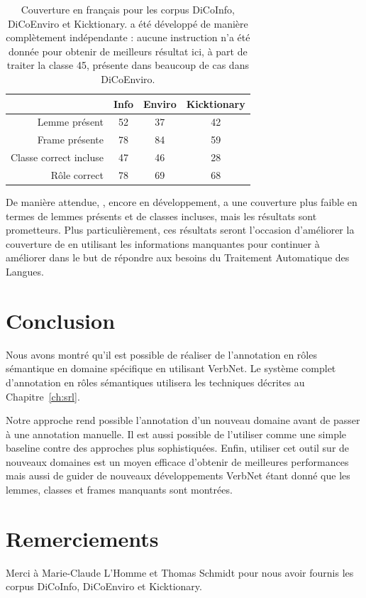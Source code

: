 \begin{table}[h]
\centering
\begin{tabular}{rccc}
  \toprule
         & Info & Enviro & Kicktionary \\
  \midrule
  Lemme présent          & 52 & 37 & 42 \\
  Frame présente         & 78 & 84 & 59 \\
  Classe correct incluse & 47 & 46 & 28 \\
  Rôle correct           & 78 & 69 & 68 \\
  \bottomrule
\end{tabular}

\caption{\label{table:coverage} Couverture \verbenet{} en français pour les
corpus DiCoInfo, DiCoEnviro et Kicktionary. \verbenet{} a été développé de
manière complètement indépendante : aucune instruction n'a été donnée pour
obtenir de meilleurs résultat ici, à part de traiter la classe 45, présente
dans beaucoup de cas dans DiCoEnviro.}
\end{table}

De manière attendue, \verbenet{}, encore en développement, a une couverture
plus faible en termes de lemmes présents et de classes incluses, mais les
résultats sont prometteurs. Plus particulièrement, ces résultats seront
l'occasion d'améliorer la couverture de \verbenet{} en utilisant les
informations manquantes pour continuer à améliorer \verbenet{} dans le but de
répondre aux besoins du Traitement Automatique des Langues.

\section*{Conclusion}

Nous avons montré qu'il est possible de réaliser de l'annotation en rôles
sémantique en domaine spécifique en utilisant VerbNet. Le système complet
d'annotation en rôles sémantiques utilisera les techniques décrites au
Chapitre~\ref{ch:srl}.

Notre approche rend possible l'annotation d'un nouveau domaine avant de passer
à une annotation manuelle. Il est aussi possible de l'utiliser comme une simple
baseline contre des approches plus sophistiquées. Enfin, utiliser cet outil sur
de nouveaux domaines est un moyen efficace d'obtenir de meilleures performances
mais aussi de guider de nouveaux développements VerbNet étant donné que les
lemmes, classes et frames manquants sont montrées.


\section*{Remerciements}

Merci à Marie-Claude L'Homme et Thomas Schmidt pour nous avoir fournis les
corpus DiCoInfo, DiCoEnviro et Kicktionary.
